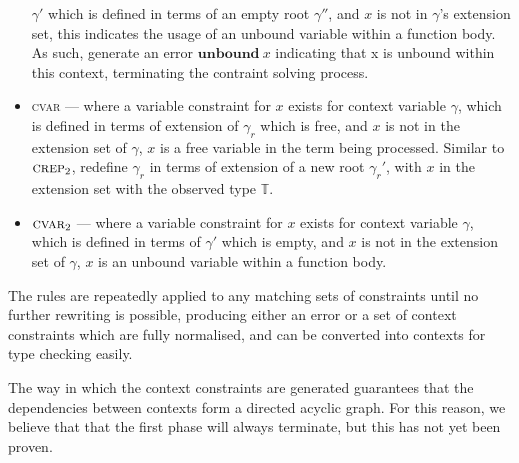 \documentclass[preprint]{sigplanconf}
\newcommand{\tinf}{\mathbb{T}}
\begin{document}
\begin{itemize}
$\gamma'$ which is defined in terms of an empty root $\gamma''$,
and $x$ is not in $\gamma$'s extension set, this indicates the usage
of an unbound variable within a function body. As such, generate an
error $\mathbf{unbound}\:x$ indicating that x is unbound within this
context, terminating the contraint solving process.
\item \textsc{cvar} --- where a variable constraint for $x$ exists
for context variable $\gamma$, which is defined in terms of
extension of $\gamma_r$ which is free, and $x$ is not in the extension
set of $\gamma$, $x$ is a free variable in the term being processed. 
Similar to $\textsc{crep}_2$, redefine $\gamma_r$
in terms of extension of a new root $\gamma_r'$, with $x$ in
the extension set with the observed type $\tinf$.
\item $\textsc{cvar}_2$ --- where a variable constraint for $x$ exists
for context variable $\gamma$, which is defined in terms of $\gamma'$
which is empty, and $x$ is not in the extension set of $\gamma$, 
$x$ is an unbound variable within a function body.
\end{itemize}

The rules are repeatedly applied to any matching sets of constraints
until no further rewriting is possible, producing either an error
or a set of context constraints which are fully normalised, and
can be converted into contexts for type checking easily.

The way in which the context constraints are generated guarantees
that the dependencies between contexts form a directed acyclic graph. For
this reason, we believe that that the first phase will always terminate,
but this has not yet been proven.
\end{document}
